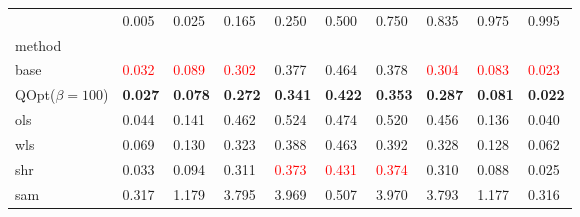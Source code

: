 \begin{tabular}{llllllllll}
\toprule
 & 0.005 & 0.025 & 0.165 & 0.250 & 0.500 & 0.750 & 0.835 & 0.975 & 0.995 \\
method &  &  &  &  &  &  &  &  &  \\
\midrule
base & \textcolor{red}{0.032} & \textcolor{red}{0.089} & \textcolor{red}{0.302} & 0.377 & 0.464 & 0.378 & \textcolor{red}{0.304} & \textcolor{red}{0.083} & \textcolor{red}{0.023} \\
\midrule
QOpt($\beta=100$) & \textbf{0.027} & \textbf{0.078} & \textbf{0.272} & \textbf{0.341} & \textbf{0.422} & \textbf{0.353} & \textbf{0.287} & \textbf{0.081} & \textbf{0.022} \\
ols & 0.044 & 0.141 & 0.462 & 0.524 & 0.474 & 0.520 & 0.456 & 0.136 & 0.040 \\
wls & 0.069 & 0.130 & 0.323 & 0.388 & 0.463 & 0.392 & 0.328 & 0.128 & 0.062 \\
shr & 0.033 & 0.094 & 0.311 & \textcolor{red}{0.373} & \textcolor{red}{0.431} & \textcolor{red}{0.374} & 0.310 & 0.088 & 0.025 \\
sam & 0.317 & 1.179 & 3.795 & 3.969 & 0.507 & 3.970 & 3.793 & 1.177 & 0.316 \\
\bottomrule
\end{tabular}